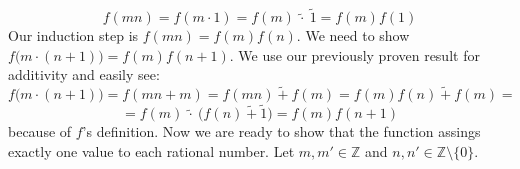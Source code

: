 \documentclass{article}
\begin{document}
\begin{equation*}
    f(mn) = f(m \cdot 1) = f(m) \ \tilde{\cdot} \ \tilde{1} = f(m)f(1)
\end{equation*}
Our induction step is \(f(mn) = f(m)f(n)\). We need to show \(f\Big(m \cdot (n + 1)\Big) = f(m)f(n+1)\). We use our
previously proven result for additivity and easily see:
\begin{equation*}
    f\Big(m \cdot (n + 1)\Big) = f(mn + m) = f(mn) \ \tilde{+} \ f(m) = f(m)f(n) \ \tilde{+} \ f(m) = 
\end{equation*}
\begin{equation*}
    = f(m) \ \tilde{\cdot} \ \Big(f(n) \ \tilde{+} \ \tilde{1}\Big) = f(m)f(n+1)
\end{equation*}
because of \(f\)'s definition. Now we are ready to show that the function assings exactly one value to each rational number.
Let \(m, m' \in \mathbb{Z}\) and \(n, n' \in \mathbb{Z}\setminus\{0\}\).
\end{document}
